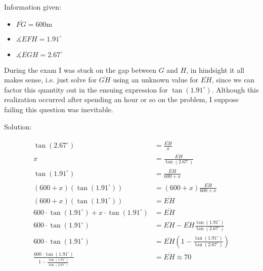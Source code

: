 \begin{figure}[!h]
\centering
{}
\end{figure}

Information given:

\begin{itemize}
    \item $\overline{FG} = 600  {\displaystyle {\text{m}}}$
    \item $\measuredangle EFH = 1.91^\circ$
    \item $\measuredangle EGH = 2.67^\circ$
\end{itemize}

During the exam I was stuck on the gap between $G$ and $H$, in hindsight it all makes sense, i.e. just solve for $\overline{GH}$ using an unknown value for $\overline{EH}$, since we can factor this quantity out in the ensuing expression for $\tan(1.91^\circ)$. Although this realization occurred after spending an hour or so on the problem, I suppose failing this question was inevitable.

Solution:

\begin{equation}
\begin{split}
\tan(2.67^\circ) &= \frac{\overline{EH}}{x} \\
x &= \frac{\overline{EH}}{\tan(2.67^\circ)} \\
\tan(1.91^\circ) &= \frac{\overline{EH}}{600 + x} \\
(600 + x)(\tan(1.91^\circ)) &= (600 + x)\frac{\overline{EH}}{600 + x} \\
(600 + x)(\tan(1.91^\circ)) &= \overline{EH} \\
600 \cdot \tan(1.91^\circ) + x \cdot \tan(1.91^\circ) &= \overline{EH} \\
600 \cdot \tan(1.91^\circ) &= \overline{EH} - \overline{EH} \frac{\tan(1.91^\circ)}{\tan(2.67^\circ)} \\
600 \cdot \tan(1.91^\circ) &= \overline{EH}(1 - \frac{\tan(1.91^\circ)}{\tan(2.67^\circ)}) \\
\frac{600 \cdot \tan(1.91^\circ)}{1 - \frac{\tan(1.91^\circ)}{\tan(2.67^\circ)}} &= \overline{EH} \approx 70
\end{split}
\end{equation}



